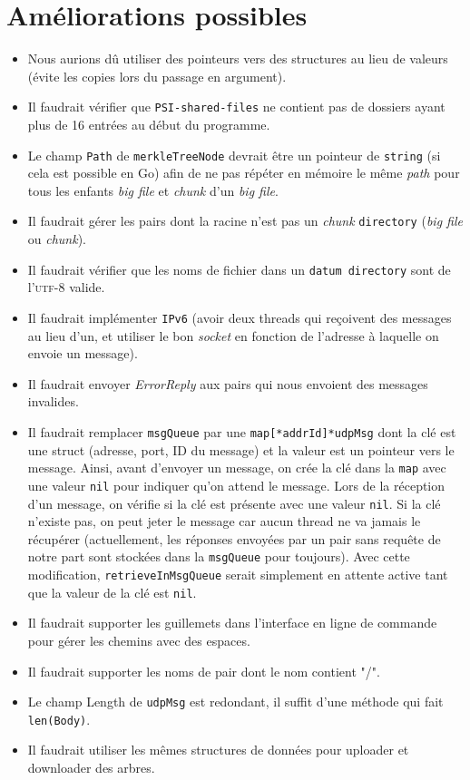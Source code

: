 \section{Améliorations possibles}
\begin{itemize}
    \item Nous aurions dû utiliser des pointeurs vers des structures au lieu de valeurs (évite les copies lors du passage en argument).
    \item Il faudrait vérifier que \texttt{PSI-shared-files} ne contient pas de dossiers ayant plus de 16 entrées au début du programme.
    \item Le champ \texttt{Path} de \texttt{merkleTreeNode} devrait être un pointeur de \texttt{string} (si cela est possible en Go) afin de ne pas répéter en mémoire le même \textit{path} pour tous les enfants \textit{big file} et \textit{chunk} d'un \textit{big file}.
    \item Il faudrait gérer les pairs dont la racine n'est pas un \textit{chunk} \texttt{directory} (\textit{big file} ou \textit{chunk}).
    \item Il faudrait vérifier que les noms de fichier dans un \texttt{datum directory} sont de l'\textsc{utf-8} valide.
    \item Il faudrait implémenter \texttt{IPv6} (avoir deux threads qui reçoivent des messages au lieu d'un, et utiliser le bon \textit{socket} en fonction de l'adresse à laquelle on envoie un message).
    \item Il faudrait envoyer \textit{ErrorReply} aux pairs qui nous envoient des messages invalides.
    \item Il faudrait remplacer \texttt{msgQueue} par une \texttt{map[*addrId]*udpMsg} dont la clé est une struct (adresse, port, ID du message) et la valeur est un pointeur vers le message. Ainsi, avant d'envoyer un message, on crée la clé dans la \texttt{map} avec une valeur \texttt{nil} pour indiquer qu'on attend le message. Lors de la réception d'un message, on vérifie si la clé est présente avec une valeur \texttt{nil}. Si la clé n'existe pas, on peut jeter le message car aucun thread ne va jamais le récupérer (actuellement, les réponses envoyées par un pair sans requête de notre part sont stockées dans la \texttt{msgQueue} pour toujours). Avec cette modification, \texttt{retrieveInMsgQueue} serait simplement en attente active tant que la valeur de la clé est \texttt{nil}.
    \item Il faudrait supporter les guillemets dans l'interface en ligne de commande pour gérer les chemins avec des espaces.
    \item Il faudrait supporter les noms de pair dont le nom contient "/".
    \item Le champ Length de \texttt{udpMsg} est redondant, il suffit d'une méthode qui fait \texttt{len(Body)}.
    \item Il faudrait utiliser les mêmes structures de données pour uploader et downloader des arbres.
    \end{itemize}
